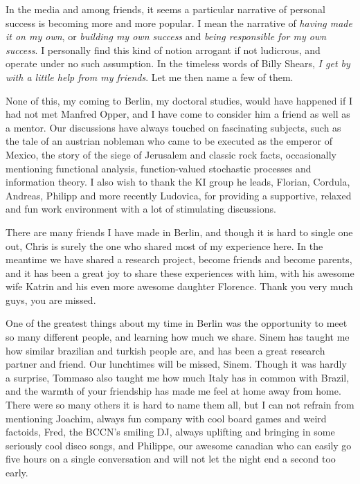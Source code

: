 
In the media and among friends, it seems a particular narrative of personal success is becoming more and more popular. I mean the narrative of \emph{having made it on my own}, or 
\emph{building my own success} and \emph{being responsible for my own success}. I personally find this kind of notion arrogant if not ludicrous, and operate under no such assumption.
In the timeless words of Billy Shears, \emph{I get by with a little help from my friends}. Let me then name a few of them.\par

None of this, my coming to Berlin, my doctoral studies, would have happened if I had not met Manfred Opper, and I have come to consider him a friend as well as a mentor. 
Our discussions have always touched on fascinating subjects, such as the tale of an austrian nobleman who came to be executed as the emperor of Mexico, the story of the siege of 
Jerusalem and classic rock facts, occasionally mentioning functional analysis, function-valued stochastic processes and information theory. I also wish to thank the KI group he leads, 
Florian, Cordula, Andreas, Philipp and more recently Ludovica, for providing a supportive, relaxed and fun work environment with a lot of stimulating discussions.\par

There are many friends I have made in Berlin, and though it is hard to single one out, Chris is surely the one who shared most of my experience here. In the meantime we have
shared a research project, become friends and become parents, and it has been a great joy to share these experiences with him, with his awesome wife Katrin and his even more 
awesome daughter Florence. Thank you very much guys, you are missed.\par

One of the greatest things about my time in Berlin was the opportunity to meet so many different people, and learning how much we share. Sinem has
taught me how similar brazilian and turkish people are, and has been a great research partner and friend. Our lunchtimes will be missed, Sinem. Though it was hardly a surprise,
Tommaso also taught me how much Italy has in common with Brazil, and the warmth of your friendship has made me feel at home away from home. There were so many others it
is hard to name them all, but I can not refrain from mentioning Joachim, always fun company with cool board games and weird factoids, Fred, the BCCN's smiling DJ, always uplifting
and bringing in some seriously cool disco songs, and Philippe, our awesome canadian who can easily go five hours on a single conversation and will not let the night end a second
too early.\par

